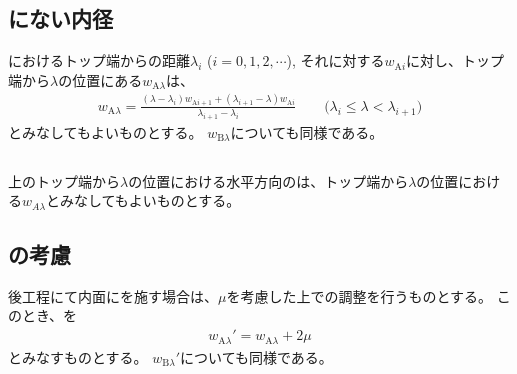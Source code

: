 \subsection{\IDTaperTable にない内径}
\nameIDTaperTable におけるトップ端からの距離$\lambda_i$ ($i = 0, 1, 2, \cdots$), それに対する\ACID $w_{\mathrm Ai}$に対し、トップ端から$\lambda$の位置にある\ACID$w_{\mathrm A\lambda}$は、
\begin{align*}
  w_{\mathrm A\lambda}
  = \frac{(\lambda-\lambda_i)w_{\mathrm Ai+1}+(\lambda_{i+1}-\lambda)w_{\mathrm Ai}}{\lambda_{i+1}-\lambda_i}
  \qquad
  \Big(\lambda_i \leq \lambda < \lambda_{i+1}\Big)
\end{align*}
とみなしてもよいものとする。
\BDID$w_{\mathrm B\lambda}$についても同様である。

\subsection{\HorizontalInnerDiameter}
\CenterCurvatureLine 上のトップ端から$\lambda$の位置における水平方向の\HorizontalInnerDiameter は、トップ端から$\lambda$の位置における\ACID$w_{A\lambda}$とみなしてもよいものとする。

\subsection{\PlatingThk の考慮}
後工程にて内面に\Plating を施す場合は、\PlatingThk$\mu$を考慮した上で\InnerDiameter の調整を行うものとする。
このとき、\ACID を
\begin{align*}
  w_{\mathrm A\lambda}' = w_{\mathrm A\lambda}+2\mu
\end{align*}
とみなすものとする。
\BDID$w_{\mathrm B\lambda}'$についても同様である。



